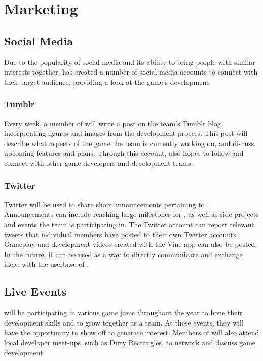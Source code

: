 \chapter{Marketing}

\section{Social Media}

Due to the popularity of social media and its ability to bring people with similar interests together, \ourteam{} has created a number of social media accounts to connect with their target audience, providing a look at the game's development.

\subsection{Tumblr}
Every week, a member of \ourteam{} will write a post on the team's Tumblr blog incorporating figures and images from the development process. This post will describe what aspects of the game the team is currently working on, and discuss upcoming features and plans. Through this account, \ourteam{} also hopes to follow and connect with other game developers and development teams.

\subsection{Twitter}
Twitter will be used to share short announcements pertaining to \ourteam{}. Announcements can include reaching large milestones for \ourgame{}, as well as side projects and events the team is participating in. The Twitter account can repost relevant tweets that individual members have posted to their own Twitter accounts. Gameplay and development videos created with the Vine app can also be posted. In the future, it can be used as a way to directly communicate and exchange ideas with the userbase of \ourgame{}.

\section{Live Events}
\ourteam{} will be participating in various game jams throughout the year to hone their development skills and to grow together as a team. At these events, they will have the opportunity to show off \ourengine{} to generate interest. Members of \ourteam{} will also attend local developer meet-ups, such as Dirty Rectangles, to network and discuss game development.


